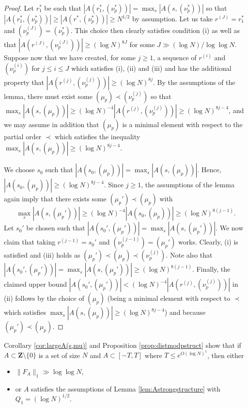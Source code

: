 \documentclass[11pt, reqno]{amsart}
\begin{document}
\begin{proof}
    Let $r_1^*$ be such that $|A(r_1^*,(\nu_p^*))|=\max_s|A(s,(\nu_p^*))|$ so that $|A(r_1^*,(\nu_p^*))|\geqslant |A(r^*,(\nu_p^*))|\geqslant N^{1/2}$ by assumption. Let us take $r^{(J)}=r^*_1$ and $(\nu_p^{(J)})=(\nu_p^*)$. This choice then clearly satisfies condition (i) as well as that $|A(r^{(J)},(\nu_p^{(J)}))|\geqslant (\log N)^{8J}$ for some $J\gg (\log N )/\log \log N$. Suppose now that we have created, for some $j\geqslant 1$, a sequence of $r^{(i)}$ and $(\nu_p^{(i)})$ for $j\leqslant i\leqslant J$ which satisfies (i), (ii) and (iii) and has the additional property that $|A(r^{(j)},(\nu_p^{(j)}))|\geqslant (\log N)^{8j}$. By the assumptions of the lemma, there must exist some $(\mu_p)\prec(\nu_p^{(j)})$ so that $\max_s|A(s,(\mu_p))|\geqslant (\log N)^{-4}|A(r^{(j)},(\nu_p^{(j)}))|\geqslant (\log N)^{8j-4}$, and we may assume in addition that $(\mu_p)$ is a minimal element with respect to the partial order $\prec$ which satisfies the inequality $\max_s|A(s,(\mu_p))|\geqslant (\log N)^{8j-4}$. 
    
    \medskip
    
    We choose $s_0$ such that $|A(s_0,(\mu_p))|=\max_s|A(s,(\mu_p))|$. Hence, $|A(s_0,(\mu_p))|\geqslant (\log N)^{8j-4}$. Since $j\geqslant 1$, the assumptions of the lemma again imply that there exists some $(\mu_p')\prec(\mu_p)$ with $$\max_s|A(s,(\mu_p'))|\geqslant (\log N)^{-4}|A(s_0,(\mu_p))|\geqslant(\log N)^{8(j-1)}.$$ Let $s_0'$ be chosen such that $|A(s_0',(\mu_p'))|=\max_s|A(s,(\mu_p'))|$. We now claim that taking $r^{(j-1)}=s_0'$ and $(\nu_p^{(j-1)})=(\mu_p')$ works. Clearly, (i) is satisfied and (iii) holds as $(\mu_p')\prec (\mu_p)\prec (\nu_p^{(j)})$. Note also that $|A(s_0',(\mu_p'))|=\max_s|A(s,(\mu_p'))|\geqslant (\log N)^{8(j-1)}$. Finally, the claimed upper bound $|A(s_0',(\mu_p'))|<(\log N)^{-4}|A(r^{(j)},(\nu_p^{(j)}))|$ in (ii) follows by the choice of $(\mu_p)$ (being a minimal element with respect to $\prec$ which satisfies $\max_s|A(s,(\mu_p))|\geqslant (\log N)^{8j-4}$) and because $(\mu_p')\prec(\mu_p)$.
\end{proof}
Corollary \ref{cor:largeA(s,mu)} and Proposition \ref{prop:distmodpstruct} show that if $A\subset\mathbf{Z}\setminus\{0\}$ is a set of size $N$ and $A\subset [-T,T]$ where $T\leqslant e^{O(\log N)^5}$, then either
\begin{itemize}
    \item $\lVert F_A\rVert_1\gg \log \log N$,
    \item or $A$ satisfies the assumptions of Lemma \ref{lem:Astrongstructure} with $Q_1=(\log N)^{1/2}$.
\end{itemize}
\end{document}
